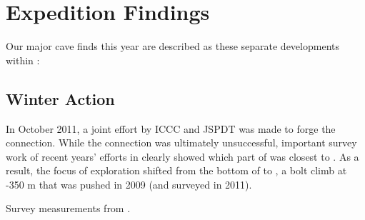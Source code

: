 
\section{Expedition Findings}

Our major cave finds this year are described as these separate
developments within :


\subsection{Winter Action}

In October 2011, a joint effort by ICCC and JSPDT was made to forge the
connection. While the connection was ultimately unsuccessful, important
survey work of recent years' efforts in  clearly
showed which part of  was closest to . As a
result, the focus of exploration shifted from the bottom of  to
, a bolt climb at -350 m that was pushed in 2009 (and surveyed in 2011).


\begin{marginfigure}
\checkoddpage \ifoddpage \forcerectofloat \else \forceversofloat \fi
\centering
 \caption{Survey measurements from .}
 \label{m2 napshiran rov survey}
\end{marginfigure}

